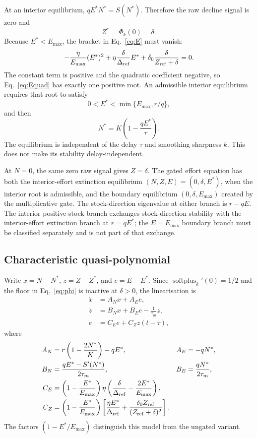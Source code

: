 \documentclass[11pt]{article}
\newcommand{\spx}{\operatorname{softplus}}
\begin{document}
At an interior equilibrium, $qE^*N^*=S(N^*)$. Therefore the raw decline signal is zero and
\begin{equation}
Z^*=\Phi_k(0)=\delta.
\end{equation}
Because $E^*<E_{\max}$, the bracket in Eq.~\eqref{eq:E} must vanish:
\begin{equation}
-\frac{\eta}{E_{\max}}(E^*)^2
+\eta\frac{\delta}{\Delta_{\rm ref}}E^*
+\delta_0\frac{\delta}{Z_{\rm ref}+\delta}=0.
\label{eq:Equad}
\end{equation}
The constant term is positive and the quadratic coefficient negative, so Eq.~\eqref{eq:Equad} has exactly one positive root. An admissible interior equilibrium requires that root to satisfy
\[
0<E^*<\min\{E_{\max},r/q\},
\]
and then
\begin{equation}
N^*=K\left(1-\frac{qE^*}{r}\right).
\label{eq:Nstar}
\end{equation}
The equilibrium is independent of the delay $\tau$ and smoothing sharpness $k$. This does not make its stability delay-independent.

At $N=0$, the same zero raw signal gives $Z=\delta$. The gated effort equation has both the interior-effort extinction equilibrium $(N,Z,E)=(0,\delta,E^*)$, when the interior root is admissible, and the boundary equilibrium $(0,\delta,E_{\max})$ created by the multiplicative gate. The stock-direction eigenvalue at either branch is $r-qE$. The interior positive-stock branch exchanges stock-direction stability with the interior-effort extinction branch at $r=qE^*$; the $E=E_{\max}$ boundary branch must be classified separately and is not part of that exchange.

\subsection{Characteristic quasi-polynomial}

Write $x=N-N^*$, $z=Z-Z^*$, and $e=E-E^*$. Since $\spx_k'(0)=1/2$ and the floor in Eq.~\eqref{eq:phi} is inactive at $\delta>0$, the linearisation is
\begin{align}
\dot x &= A_Nx+A_Ee,\\
\dot z &= B_Nx+B_Ee-\frac{1}{\tau_m}z,\\
\dot e &= C_Ee+C_Zz(t-\tau),
\end{align}
where
\begin{align}
A_N&=r\left(1-\frac{2N^*}{K}\right)-qE^*,
& A_E&=-qN^*,\\
B_N&=\frac{qE^*-S'(N^*)}{2\tau_m},
& B_E&=\frac{qN^*}{2\tau_m},\\
C_E&=\left(1-\frac{E^*}{E_{\max}}\right)
\eta\left(\frac{\delta}{\Delta_{\rm ref}}-\frac{2E^*}{E_{\max}}\right),\\
C_Z&=\left(1-\frac{E^*}{E_{\max}}\right)
\left[
\frac{\eta E^*}{\Delta_{\rm ref}}+
\frac{\delta_0Z_{\rm ref}}{(Z_{\rm ref}+\delta)^2}
\right].
\end{align}
The factors $(1-E^*/E_{\max})$ distinguish this model from the ungated variant.
\end{document}
